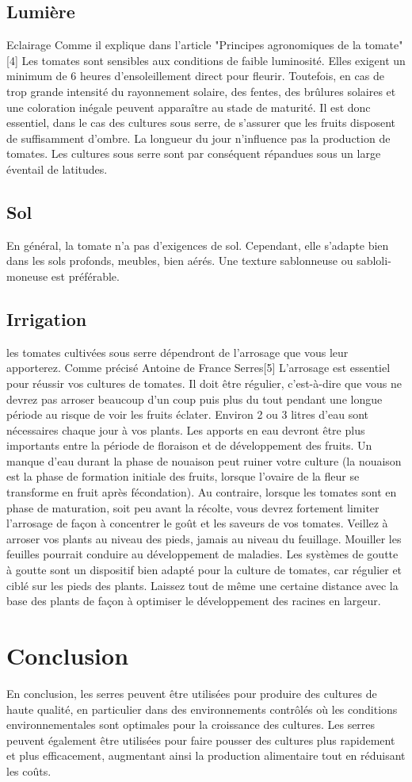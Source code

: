 \subsection{Lumière}
Eclairage
Comme il  explique dans l’article "Principes agronomiques de la tomate" [4]
Les tomates sont sensibles aux conditions de
faible luminosité. Elles exigent un minimum de 6 heures d’ensoleillement direct pour
fleurir. Toutefois, en cas de trop grande intensité du rayonnement solaire, des fentes, des
brûlures solaires et une coloration inégale peuvent apparaître au stade de maturité. Il est
donc essentiel, dans le cas des cultures sous serre, de s’assurer que les fruits disposent de
suffisamment d’ombre. La longueur du jour n’influence pas la production de tomates. Les
cultures sous serre sont par conséquent répandues sous un large éventail de latitudes.
\subsection{Sol}
En général, la tomate n'a pas d'exigences de sol. Cependant, elle s'adapte bien dans les sols profonds, meubles, bien aérés. Une texture sablonneuse ou sabloli-moneuse est préférable.
\subsection{Irrigation}
les tomates cultivées sous serre dépendront de l'arrosage que vous leur apporterez. Comme précisé Antoine de France Serres[5] L'arrosage est essentiel pour réussir vos cultures de tomates. Il doit être régulier, c'est-à-dire que vous ne devrez pas arroser beaucoup d'un coup puis plus du tout pendant une longue période au risque de voir les fruits éclater. Environ 2 ou 3 litres d'eau sont nécessaires chaque jour à vos plants.
Les apports en eau devront être plus importants entre la période de floraison et de développement des fruits. Un manque d'eau durant la phase de nouaison peut ruiner votre culture (la nouaison est la phase de formation initiale des fruits, lorsque l'ovaire de la fleur se transforme en fruit après fécondation). Au contraire, lorsque les tomates sont en phase de maturation, soit peu avant la récolte, vous devrez fortement limiter l'arrosage de façon à concentrer le goût et les saveurs de vos tomates.
Veillez à arroser vos plants au niveau des pieds, jamais au niveau du feuillage. Mouiller les feuilles pourrait conduire au développement de maladies.
Les systèmes de goutte à goutte sont un dispositif bien adapté pour la culture de tomates, car régulier et ciblé sur les pieds des plants. Laissez tout de même une certaine distance avec la base des plants de façon à optimiser le développement des racines en largeur.
\section{Conclusion}
En conclusion, les serres peuvent être utilisées pour produire des cultures de haute qualité, en particulier dans des environnements contrôlés où les conditions environnementales sont optimales pour la croissance des cultures. Les serres peuvent également être utilisées pour faire pousser des cultures plus rapidement et plus efficacement, augmentant ainsi la production alimentaire tout en réduisant les coûts. 
